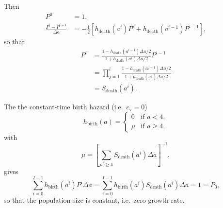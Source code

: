\documentclass[12pt]{article}
\begin{document}
Then
\begin{subequations}
  \begin{align}
    P^0 &= 1,
    \\
    \frac{P^i - P^{i - 1}}{\Delta a}
    &= - \frac{1}{2}
    \left[h_{\text{death}}(a^i) P^i
      + h_{\text{death}}(a^{i - 1}) P^{i - 1}\right],
  \end{align}
\end{subequations}
so that
\begin{equation}
  \begin{split}
    P^i &=
    \frac{1 - h_{\text{death}}(a^{i - 1}) \Delta a / 2}
    {1 + h_{\text{death}}(a^i) \Delta a / 2} P^{i - 1}
    \\
    &=
    \prod_{j = 1}^i
    \frac{1 - h_{\text{death}}(a^{j - 1}) \Delta a / 2}
    {1 + h_{\text{death}}(a^j) \Delta a / 2}
    \\
    &= S_{\text{death}}(a^i).
  \end{split}
\end{equation}

The the constant-time birth hazard
(i.e.~$c_{\mathrm{v}} = 0$)
\begin{equation}
  h_{\text{birth}}(a) =
  \begin{cases}
    0 & \text{if $a < 4$}, \\
    \mu & \text{if $a \geq 4$},
  \end{cases}
\end{equation}
with
\begin{equation}
  \mu =
  \left[
    \sum_{a^i \geq 4}
    S_{\text{death}}(a^i)
    \Delta a
  \right]^{-1},
\end{equation}
gives
\begin{equation}
  \sum_{i = 0}^{I - 1}
  h_{\text{birth}}(a^i) P^i
  \Delta a
  = \sum_{i = 0}^{I - 1}
  h_{\text{birth}}(a^i) S_{\text{death}}(a^i)
  \Delta a
  = 1 = P_0,
\end{equation}
so that the population size is constant, i.e.~zero growth rate.
\end{document}
